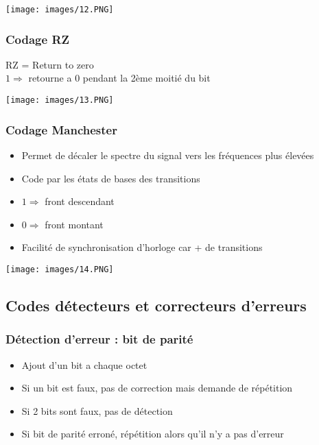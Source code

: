 \documentclass[a4paper]{article}
\begin{document}
\begin{center}
    \texttt{[image: images/12.PNG]}
\end{center}

\subsubsection{Codage RZ}
RZ = Return to zero\\
$1 \Rightarrow$ retourne a 0 pendant la 2ème moitié du bit
\begin{center}
    \texttt{[image: images/13.PNG]}
\end{center}

\subsubsection{Codage Manchester}
\begin{itemize}
    \item Permet de décaler le spectre du signal vers les fréquences plus élevées
    \item Code par les états de bases des transitions
    \item $1 \Rightarrow$ front descendant
    \item $0 \Rightarrow$ front montant
    \item Facilité de synchronisation d'horloge car + de transitions
\end{itemize}
\begin{center}
    \texttt{[image: images/14.PNG]}
\end{center}

\subsection{Codes détecteurs et correcteurs d'erreurs}

\subsubsection{Détection d'erreur : bit de parité}
\begin{itemize}
    \item Ajout d'un bit a chaque octet
    \item Si un bit est faux, pas de correction mais demande de répétition
    \item Si 2 bits sont faux, pas de détection
    \item Si bit de parité erroné, répétition alors qu'il n'y a pas d'erreur
\end{itemize}
\end{document}
